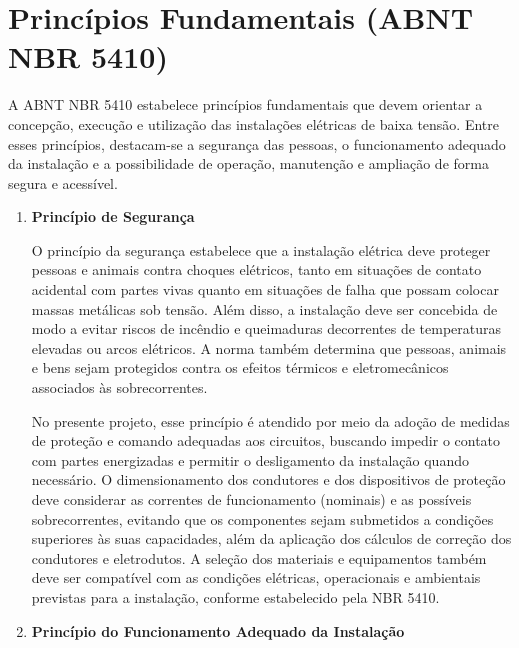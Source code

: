 \documentclass[12pt,openright,oneside,a4paper,brazil]{abntex2}
\begin{document}
\section{Princípios Fundamentais (ABNT NBR 5410)}

\hspace{1.27cm}A ABNT NBR 5410 estabelece princípios fundamentais que devem orientar a concepção, execução e utilização das instalações elétricas de baixa tensão. Entre esses princípios, destacam-se a segurança das pessoas, o funcionamento adequado da instalação e a possibilidade de operação, manutenção e ampliação de forma segura e acessível.

    \begin{enumerate}[label=\roman*)]
        \item \textbf{Princípio de Segurança}
    
        \hspace{1.27cm} O princípio da segurança estabelece que a instalação elétrica deve proteger pessoas e animais contra choques elétricos, tanto em situações de contato acidental com partes vivas quanto em situações de falha que possam colocar massas metálicas sob tensão. Além disso, a instalação deve ser concebida de modo a evitar riscos de incêndio e queimaduras decorrentes de temperaturas elevadas ou arcos elétricos. A norma também determina que pessoas, animais e bens sejam protegidos contra os efeitos térmicos e eletromecânicos associados às sobrecorrentes.

        \hspace{1.27cm} No presente projeto, esse princípio é atendido por meio da adoção de medidas de proteção e comando adequadas aos circuitos, buscando impedir o contato com partes energizadas e permitir o desligamento da instalação quando necessário. O dimensionamento dos condutores e dos dispositivos de proteção deve considerar as correntes de funcionamento (nominais) e as possíveis sobrecorrentes, evitando que os componentes sejam submetidos a condições superiores às suas capacidades, além da aplicação dos cálculos de correção dos condutores e eletrodutos. A seleção dos materiais e equipamentos também deve ser compatível com as condições elétricas, operacionais e ambientais previstas para a instalação, conforme estabelecido pela NBR 5410.

        \item \textbf{Princípio do Funcionamento Adequado da Instalação}
        

\end{enumerate}
\end{document}
